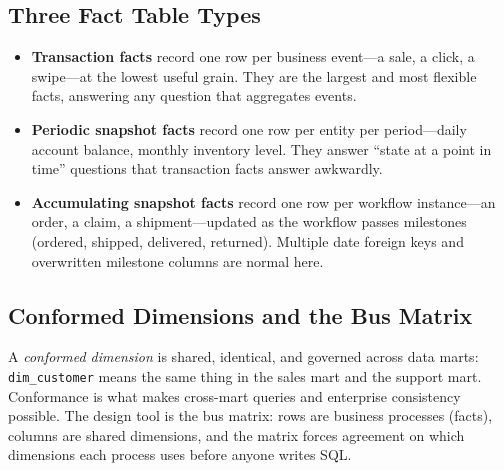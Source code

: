 \subsection{Three Fact Table Types}
\begin{itemize}
    \item \textbf{Transaction facts} record one row per business event---a sale, a click, a swipe---at the lowest useful grain. They are the largest and most flexible facts, answering any question that aggregates events.
    \item \textbf{Periodic snapshot facts} record one row per entity per period---daily account balance, monthly inventory level. They answer ``state at a point in time'' questions that transaction facts answer awkwardly.
    \item \textbf{Accumulating snapshot facts} record one row per workflow instance---an order, a claim, a shipment---updated as the workflow passes milestones (ordered, shipped, delivered, returned). Multiple date foreign keys and overwritten milestone columns are normal here.
\end{itemize}

\subsection{Conformed Dimensions and the Bus Matrix}
A \emph{conformed dimension} is shared, identical, and governed across data marts: \texttt{dim\_customer} means the same thing in the sales mart and the support mart. Conformance is what makes cross-mart queries and enterprise consistency possible. The design tool is the bus matrix: rows are business processes (facts), columns are shared dimensions, and the matrix forces agreement on which dimensions each process uses before anyone writes SQL.

